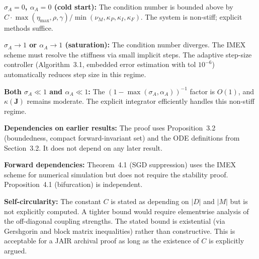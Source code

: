 \begin{boundary-case}
\textbf{$\sigma_A = 0$, $\alpha_A = 0$ (cold start):}
The condition number is bounded above by $C \cdot
\max(\eta_{\max}, \rho, \gamma) / \min(\nu_M, \kappa_P, \kappa_I, \kappa_F)$.
The system is non-stiff; explicit methods suffice.

\textbf{$\sigma_A \to 1$ or $\alpha_A \to 1$ (saturation):}
The condition number diverges. The IMEX scheme must resolve the
stiffness via small implicit steps. The adaptive step-size controller
(Algorithm~3.1, embedded error estimation with tol $10^{-6}$)
automatically reduces step size in this regime.

\textbf{Both $\sigma_A \ll 1$ and $\alpha_A \ll 1$:}
The $(1 - \max(\sigma_A, \alpha_A))^{-1}$ factor is $O(1)$, and
$\kappa(\mathbf{J})$ remains moderate. The explicit integrator
efficiently handles this non-stiff regime.
\end{boundary-case}

\begin{circularity-check}
\textbf{Dependencies on earlier results:} The proof uses
Proposition~3.2 (boundedness, compact forward-invariant set) and
the ODE definitions from Section~3.2. It does not depend on any
later result.

\textbf{Forward dependencies:} Theorem~4.1 (SGD suppression) uses
the IMEX scheme for numerical simulation but does not require the
stability proof. Proposition~4.1 (bifurcation) is independent.

\textbf{Self-circularity:} The constant $C$ is stated as depending
on $|D|$ and $|M|$ but is not explicitly computed. A tighter bound
would require elementwise analysis of the off-diagonal coupling
strengths. The stated bound is existential (via Gershgorin and block
matrix inequalities) rather than constructive. This is acceptable
for a JAIR archival proof as long as the existence of $C$ is
explicitly argued.
\end{circularity-check}
